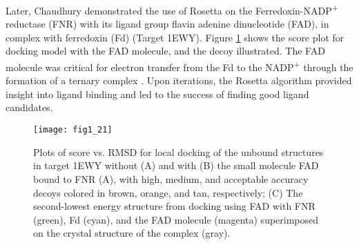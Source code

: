 \begin{refsection}
Later, Chaudhury  demonstrated the use of Rosetta on the
Ferredoxin-NADP\textsuperscript{+} reductase (FNR) with its ligand group flavin
adenine dinucleotide (FAD), in complex with ferredoxin (Fd) (Target
1EWY)\cite{Chaudhury2011}. Figure \ref{fig:macro-ligand} shows the score plot
for docking model with the FAD molecule, and the decoy illustrated. The FAD
molecule was critical for electron transfer from the Fd to the
NADP\textsuperscript{+} through the formation of a ternary complex \cite{Hermoso2002}.
Upon iterations, the Rosetta algorithm provided insight into ligand binding and
led to the success of finding good ligand candidates. 
\begin{figure}[p] \centering \texttt{[image: fig1\_21]}
    \caption[Plots of score vs. RMSD for local docking of the unbound
        structures in target 1EWY without (A) and with (B) the small molecule
        FAD bound to FNR (A), with high, medium, and acceptable accuracy decoys
        colored in brown, orange, and tan, respectively; (C) The second-lowest
        energy structure from docking using FAD with FNR (green), Fd (cyan),
        and the FAD molecule (magenta) superimposed on the crystal structure of
    the complex (gray)] {Plots of score vs. RMSD for local docking of the
        unbound structures in target 1EWY without (A) and with (B) the small
        molecule FAD bound to FNR (A), with high, medium, and acceptable
        accuracy decoys colored in brown, orange, and tan, respectively; (C)
        The second-lowest energy structure from docking using FAD with FNR
        (green), Fd (cyan), and the FAD molecule (magenta) superimposed on the
        crystal structure of the complex (gray)\cite{Chaudhury2011}.} 
        \label{fig:macro-ligand} 
\end{figure}


\end{refsection}
